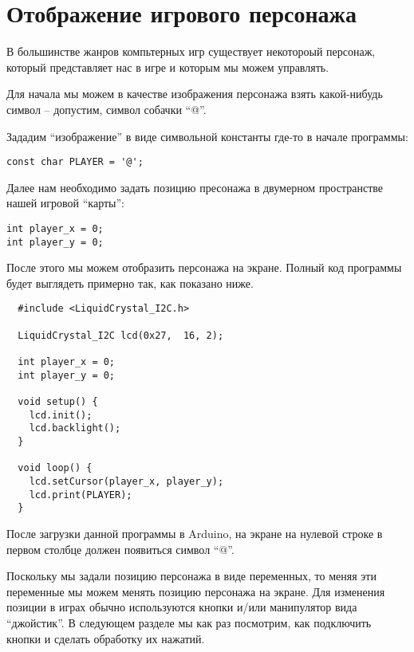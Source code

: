 \documentclass[../sparc.tex]{subfiles}
\begin{document}
\section{Отображение игрового персонажа}

В большинстве жанров компьтерных игр существует некотороый персонаж, который
представляет нас в игре и которым мы можем управлять.

Для начала мы можем в качестве изображения персонажа взять какой-нибудь символ
-- допустим, символ собачки ``@''.

Зададим ``изображение'' в виде символьной константы где-то в начале программы:

\begin{verbatim}
const char PLAYER = '@';
\end{verbatim}

Далее нам необходимо задать позицию пресонажа в двумерном пространстве нашей
игровой ``карты'':

\begin{verbatim}
int player_x = 0;
int player_y = 0;
\end{verbatim}

После этого мы можем отобразить персонажа на экране.  Полный код программы будет
выглядеть примерно так, как показано ниже.

\begin{verbatim}
  #include <LiquidCrystal_I2C.h>

  LiquidCrystal_I2C lcd(0x27,  16, 2);

  int player_x = 0;
  int player_y = 0;

  void setup() {
    lcd.init();
    lcd.backlight();
  }

  void loop() {
    lcd.setCursor(player_x, player_y);
    lcd.print(PLAYER);
  }
\end{verbatim}

После загрузки данной программы в Arduino, на экране на нулевой строке в первом
столбце должен появиться символ ``@''.

Поскольку мы задали позицию персонажа в виде переменных, то меняя эти переменные
мы можем менять позицию персонажа на экране.  Для изменения позиции в играх
обычно используются кнопки и/или манипулятор вида ``джойстик''.  В следующем
разделе мы как раз посмотрим, как подключить кнопки и сделать обработку их
нажатий.
\end{document}

